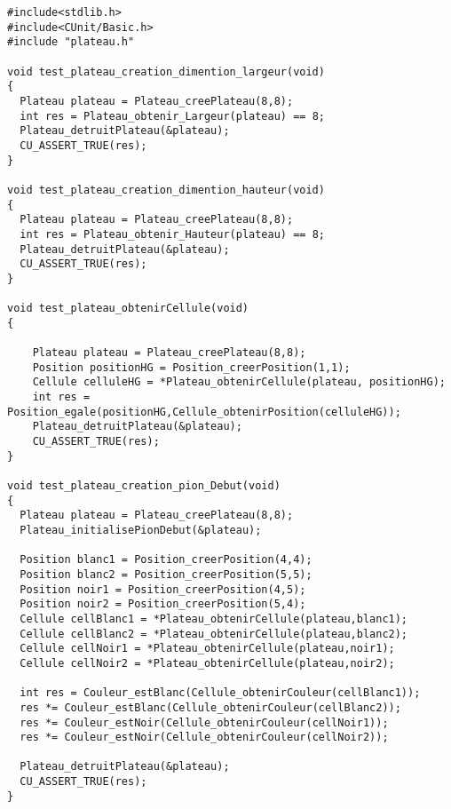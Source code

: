  
\begin{lstlisting}
#include<stdlib.h>
#include<CUnit/Basic.h>
#include "plateau.h"

void test_plateau_creation_dimention_largeur(void)
{
  Plateau plateau = Plateau_creePlateau(8,8);
  int res = Plateau_obtenir_Largeur(plateau) == 8;
  Plateau_detruitPlateau(&plateau);
  CU_ASSERT_TRUE(res);
}

void test_plateau_creation_dimention_hauteur(void)
{
  Plateau plateau = Plateau_creePlateau(8,8);
  int res = Plateau_obtenir_Hauteur(plateau) == 8;
  Plateau_detruitPlateau(&plateau);
  CU_ASSERT_TRUE(res);
}

void test_plateau_obtenirCellule(void)
{

    Plateau plateau = Plateau_creePlateau(8,8);
    Position positionHG = Position_creerPosition(1,1);
    Cellule celluleHG = *Plateau_obtenirCellule(plateau, positionHG);
    int res = Position_egale(positionHG,Cellule_obtenirPosition(celluleHG));
    Plateau_detruitPlateau(&plateau);
    CU_ASSERT_TRUE(res);
}

void test_plateau_creation_pion_Debut(void)
{
  Plateau plateau = Plateau_creePlateau(8,8);
  Plateau_initialisePionDebut(&plateau);

  Position blanc1 = Position_creerPosition(4,4);
  Position blanc2 = Position_creerPosition(5,5);
  Position noir1 = Position_creerPosition(4,5);
  Position noir2 = Position_creerPosition(5,4);
  Cellule cellBlanc1 = *Plateau_obtenirCellule(plateau,blanc1);
  Cellule cellBlanc2 = *Plateau_obtenirCellule(plateau,blanc2);
  Cellule cellNoir1 = *Plateau_obtenirCellule(plateau,noir1);
  Cellule cellNoir2 = *Plateau_obtenirCellule(plateau,noir2);

  int res = Couleur_estBlanc(Cellule_obtenirCouleur(cellBlanc1));
  res *= Couleur_estBlanc(Cellule_obtenirCouleur(cellBlanc2));
  res *= Couleur_estNoir(Cellule_obtenirCouleur(cellNoir1));
  res *= Couleur_estNoir(Cellule_obtenirCouleur(cellNoir2));

  Plateau_detruitPlateau(&plateau);
  CU_ASSERT_TRUE(res);
}
\end{lstlisting}
 
